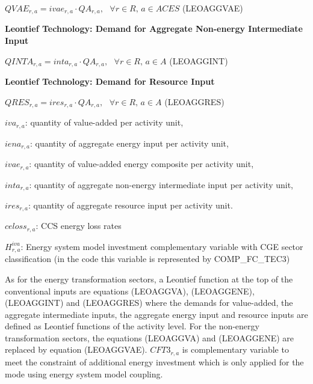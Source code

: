 \documentclass[10pt,a4paper,titlepage,dvipdfmx]{book}
\begin{document}
\begin{center}$QVAE_{r,a}=ivae_{r,a}\cdot QA_{r,a},\,\,\,\,\forall r\in R,\,a\in ACES$ (LEOAGGVAE)
\end{center}

\begin{flushleft}\textbf{Leontief Technology: Demand for Aggregate Non-energy Intermediate Input}\end{flushleft}


\begin{center}$QINTA_{r,a}=inta_{r,a}\cdot QA_{r,a},\,\,\,\,\forall r\in R,\,a\in A$ (LEOAGGINT)
\end{center}

\begin{flushleft}\textbf{Leontief Technology: Demand for Resource Input}\end{flushleft}


\begin{center}$QRES_{r,a}=ires_{r,a}\cdot QA_{r,a},\,\,\,\,\forall r\in R,\,a\in A$ (LEOAGGRES)\label{ref-0032}
\end{center}

\begin{flushleft}
$iva_{r,a}$: quantity of value-added per activity unit,

$iena_{r,a}$: quantity of aggregate energy input per activity unit,

$ivae_{r,a}$: quantity of value-added energy composite per activity unit,

$inta_{r,a}$: quantity of aggregate non-energy intermediate input per activity unit,

$ires_{r,a}$: quantity of aggregate resource input per activity unit.

$\textit{celoss}_{r,a}$: CCS energy loss rates

$H _{r,a}^{iva}$: Energy system model investment complementary variable with CGE sector classification (in the code this variable is represented by COMP\_FC\_TEC3)\\
\end{flushleft}

As for the energy transformation sectors, a Leontief function at the top of the conventional inputs are equations (LEOAGGVA), (LEOAGGENE), (LEOAGGINT) and (LEOAGGRES) where the demands for value-added, the aggregate intermediate inputs, the aggregate energy input and resource inputs are defined as Leontief functions of the activity level. For the non-energy transformation sectors, the equations (LEOAGGVA) and (LEOAGGENE) are replaced by equation (LEOAGGVAE). $CFT3_{r,a}$ is complementary variable to meet the constraint of additional energy investment which is only applied for the mode using energy system model coupling.
\end{document}

